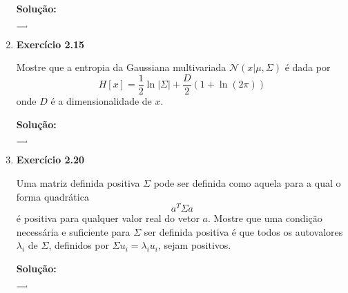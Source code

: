 \begin{enumerate}
\par
\textbf{Solução:}

$ \underline{ \quad} \vline $



\item \textbf{Exercício 2.15} \par
Mostre que a entropia da Gaussiana multivariada $ \mathcal{N}(x|\mu, \Sigma) $ é dada por 
\begin{equation*}
    H[x] = \frac{1}{2} \ln |\Sigma| + \frac{D}{2} (1 + \ln(2\pi))
\end{equation*}
onde $ D $ é a dimensionalidade de $ x $.

\par
\textbf{Solução:}

$ \underline{ \quad} \vline $



\item \textbf{Exercício 2.20} \par
Uma matriz definida positiva $\Sigma$ pode ser definida como aquela para a qual o forma quadrática
\begin{equation*}
    a^T \Sigma a
\end{equation*} é positiva para qualquer valor real do vetor $a$. Mostre que uma condição necessária e suficiente para $\Sigma$ ser definida positiva é que todos os autovalores $\lambda_i$ de $\Sigma$, definidos por $\Sigma u_i = \lambda_i u_i$, sejam positivos.

\par
\textbf{Solução:}

$ \underline{ \quad} \vline $




\end{enumerate}